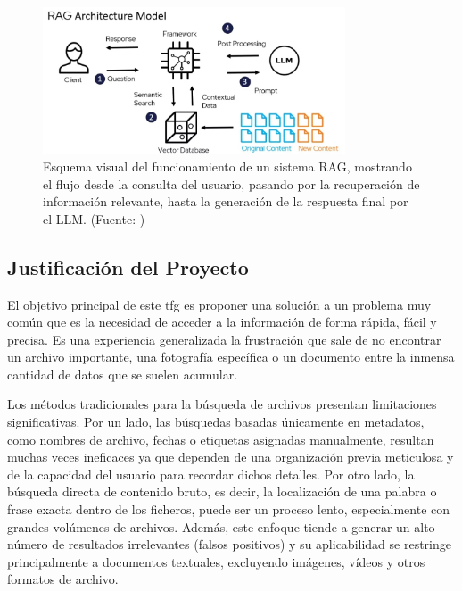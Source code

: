 \bigskip %
\begin{figure}[H] %
    \centering %
    \includegraphics[width=0.8\textwidth]{archivos/RAG_scheme.png} %
    \caption[Esquema de un sistema RAG]{Esquema visual del funcionamiento de un sistema RAG, mostrando el flujo desde la consulta del usuario, pasando por la recuperación de información relevante, hasta la generación de la respuesta final por el LLM. (Fuente: \citep{noauthor_advanced_nodate})} %
    \label{fig:rag_scheme} %
\end{figure}
\bigskip %

\subsection{Justificación del Proyecto}
El objetivo principal de este \gls{tfg} es proponer una solución a un problema muy común que es la necesidad de acceder a la información de forma rápida, fácil y precisa. Es una experiencia generalizada la frustración que sale de no encontrar un archivo importante, una fotografía específica o un documento entre la inmensa cantidad de datos que se suelen acumular.

Los métodos tradicionales para la búsqueda de archivos presentan limitaciones significativas. Por un lado, las búsquedas basadas únicamente en metadatos, como nombres de archivo, fechas o etiquetas asignadas manualmente, resultan muchas veces ineficaces ya que dependen de una organización previa meticulosa y de la capacidad del usuario para recordar dichos detalles. Por otro lado, la búsqueda directa de contenido bruto, es decir, la localización de una palabra o frase exacta dentro de los ficheros, puede ser un proceso lento, especialmente con grandes volúmenes de archivos. Además, este enfoque tiende a generar un alto número de resultados irrelevantes (falsos positivos) y su aplicabilidad se restringe principalmente a documentos textuales, excluyendo imágenes, vídeos y otros formatos de archivo.

